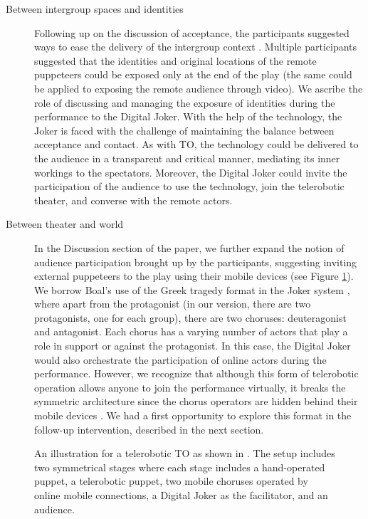 \documentclass[dissertation,math,vertlayout,pdfa,colorlinks]{aaltoseries}
\begin{document}
\begin{description}
   \item[Between intergroup spaces and identities] Following up on the discussion of acceptance, the participants suggested ways to ease the delivery of the intergroup context \cite[p. 16]{peledTeleroboticTheaterOppressed2025}. Multiple participants suggested that the identities and original locations of the remote puppeteers could be exposed only at the end of the play (the same could be applied to exposing the remote audience through video). We ascribe the role of discussing and managing the exposure of identities during the performance to the Digital Joker. With the help of the technology, the Joker is faced with the challenge of maintaining the balance between acceptance and contact. As with TO, the technology could be delivered to the audience in a transparent and critical manner, mediating its inner workings to the spectators. Moreover, the Digital Joker could invite the participation of the audience to use the technology, join the telerobotic theater, and converse with the remote actors.
   \item[Between theater and world] In the Discussion section of the paper, we further expand the notion of audience participation brought up by the participants, suggesting inviting external puppeteers to the play using their mobile devices \cite[p. 20]{peledTeleroboticTheaterOppressed2025} (see Figure \ref{fig:telerobotic-to}). We borrow Boal's use of the Greek tragedy format in the Joker system \cite[p. 160]{boalTheatreOppressed2008}, where apart from the protagonist (in our version, there are two protagonists, one for each group), there are two choruses: deuteragonist and antagonist. Each chorus has a varying number of actors that play a role in support or against the protagonist. In this case, the Digital Joker would also orchestrate the participation of online actors during the performance. However, we recognize that although this form of telerobotic operation allows anyone to join the performance virtually, it breaks the symmetric architecture since the chorus operators are hidden behind their mobile devices \cite[p. 20]{peledTeleroboticTheaterOppressed2025}. We had a first opportunity to explore this format in the follow-up intervention, described in the next section.
\end{description}


\begin{figure}
    \centering
    
    \caption{An illustration for a telerobotic TO as shown in \cite{peledTeleroboticTheaterOppressed2025}. The setup includes two symmetrical stages where each stage includes a hand-operated puppet, a telerobotic puppet, two mobile choruses operated by online mobile connections, a Digital Joker as the facilitator, and an audience.}
    \label{fig:telerobotic-to}
\end{figure}
\end{document}
